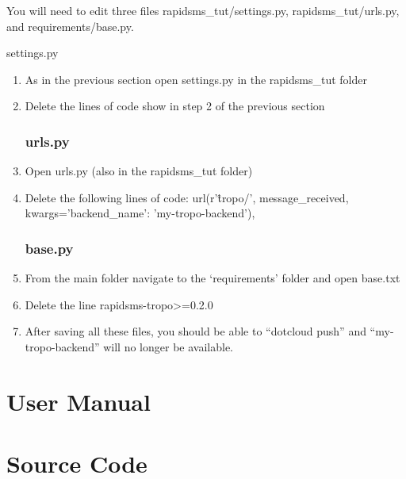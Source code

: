 You will need to edit three files rapidsms\_tut/settings.py, rapidsms\_tut/urls.py, and requirements/base.py.

settings.py
\begin{enumerate}
	\item As in the previous section open settings.py in the rapidsms\_tut folder
	\item Delete the lines of code show in step 2 of the previous section

\subsubsection*{urls.py}
 	\item Open urls.py (also in the rapidsms\_tut folder)
	\item Delete the following lines of code:
    url(r'\^tropo/',
      message\_received,
      kwargs={'backend\_name': 'my-tropo-backend'}),
\subsubsection*{base.py}
	\item From the main folder navigate to the ‘requirements’ folder and open base.txt
	\item Delete the line rapidsms-tropo>=0.2.0

	\item After saving all these files, you should be able to “dotcloud push” and “my-tropo-backend” will no longer be available.
\end{enumerate}



\section{User Manual}

\section{Source Code}